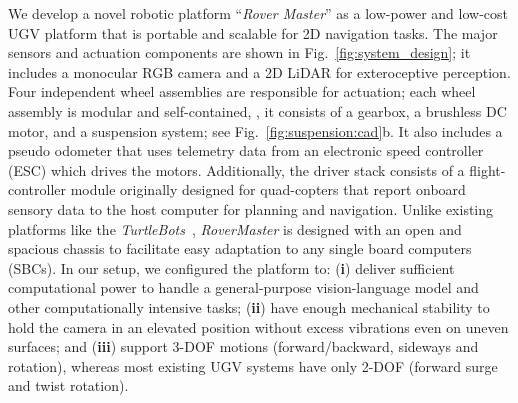 We develop a novel robotic platform ``\textit{Rover Master}'' as a low-power and low-cost UGV platform that is portable and scalable for 2D navigation tasks. The major sensors and actuation components are shown in Fig.~\ref{fig:system_design}; it includes a monocular RGB camera and a 2D LiDAR for exteroceptive perception. Four independent wheel assemblies are responsible for actuation; each wheel assembly is modular and self-contained, \ie, it consists of a gearbox, a brushless DC motor, and a suspension system; see Fig.~\ref{fig:suspension:cad}b. It also includes a pseudo odometer that uses telemetry data from an electronic speed controller (ESC) which drives the motors. Additionally, the driver stack consists of a flight-controller module originally designed for quad-copters that report onboard sensory data to the host computer for planning and navigation. Unlike existing platforms like the \textit{TurtleBots}~\cite{turtlebot}, \textit{RoverMaster} is designed with an open and spacious chassis to facilitate easy adaptation to any single board computers (SBCs). In our setup, we configured the platform to: (\textbf{i}) deliver sufficient computational power to handle a general-purpose vision-language model and other computationally intensive tasks; (\textbf{ii}) have enough mechanical stability to hold the camera in an elevated position without excess vibrations even on uneven surfaces; and (\textbf{iii}) support 3-DOF motions (forward/backward, sideways and rotation), whereas most existing UGV systems have only 2-DOF (forward surge and twist rotation).




